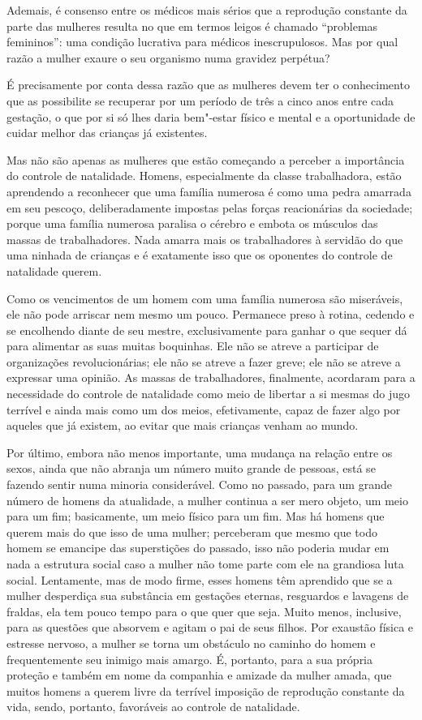 Ademais, é consenso entre os médicos mais sérios que a reprodução
constante da parte das mulheres resulta no que em termos leigos é
chamado ``problemas femininos'': uma condição lucrativa para médicos
inescrupulosos. Mas por qual razão a mulher exaure o seu organismo numa
gravidez perpétua?

É precisamente por conta dessa razão que as mulheres devem ter o
conhecimento que as possibilite se recuperar por um período de três a
cinco anos entre cada gestação, o que por si só lhes daria bem"-estar
físico e mental e a oportunidade de cuidar melhor das crianças já
existentes.

Mas não são apenas as mulheres que estão começando a perceber a
importância do controle de natalidade. Homens, especialmente da classe
trabalhadora, estão aprendendo a reconhecer que uma família numerosa é
como uma pedra amarrada em seu pescoço, deliberadamente impostas
pelas forças reacionárias da sociedade; porque uma família numerosa
paralisa o cérebro e embota os músculos das massas de trabalhadores.
Nada amarra mais os trabalhadores à servidão do que uma ninhada de
crianças e é exatamente isso que os oponentes do controle de natalidade
querem.

Como os vencimentos de um homem com uma família numerosa são miseráveis,
ele não pode arriscar nem mesmo um pouco. Permanece preso à
rotina, cedendo e se encolhendo diante de seu mestre, exclusivamente para
ganhar o que sequer dá para alimentar as suas muitas boquinhas. Ele não se
atreve a participar de organizações revolucionárias; ele não se atreve a
fazer greve; ele não se atreve a expressar uma opinião. As massas de
trabalhadores, finalmente, acordaram para a necessidade do controle de
natalidade como meio de libertar a si mesmas do jugo terrível e ainda
mais como um dos meios, efetivamente, capaz de fazer algo por aqueles que já existem, ao evitar que mais crianças venham ao mundo.

Por último, embora não menos importante, uma mudança na relação entre os
sexos, ainda que não abranja um número muito grande de pessoas, está se
fazendo sentir numa minoria considerável. Como no passado, para um
grande número de homens da atualidade, a mulher continua a ser mero
objeto, um meio para um fim; basicamente, um meio físico para um fim.
Mas há homens que querem mais do que isso de uma mulher; perceberam que
mesmo que todo homem se emancipe das superstições do passado, isso não
poderia mudar em nada a estrutura social caso a mulher não tome parte
com ele na grandiosa luta social. Lentamente, mas de modo firme, esses
homens têm aprendido que se a mulher desperdiça sua substância em
gestações eternas, resguardos e lavagens de fraldas, ela tem pouco tempo
para o que quer que seja. Muito menos, inclusive, para as questões que
absorvem e agitam o pai de seus filhos. Por exaustão física e estresse
nervoso, a mulher se torna um obstáculo no caminho do homem e
frequentemente seu inimigo mais amargo. É, portanto, para a sua própria
proteção e também em nome da companhia e amizade da mulher amada, que
muitos homens a querem livre da terrível imposição de reprodução
constante da vida, sendo, portanto, favoráveis ao controle de
natalidade.

